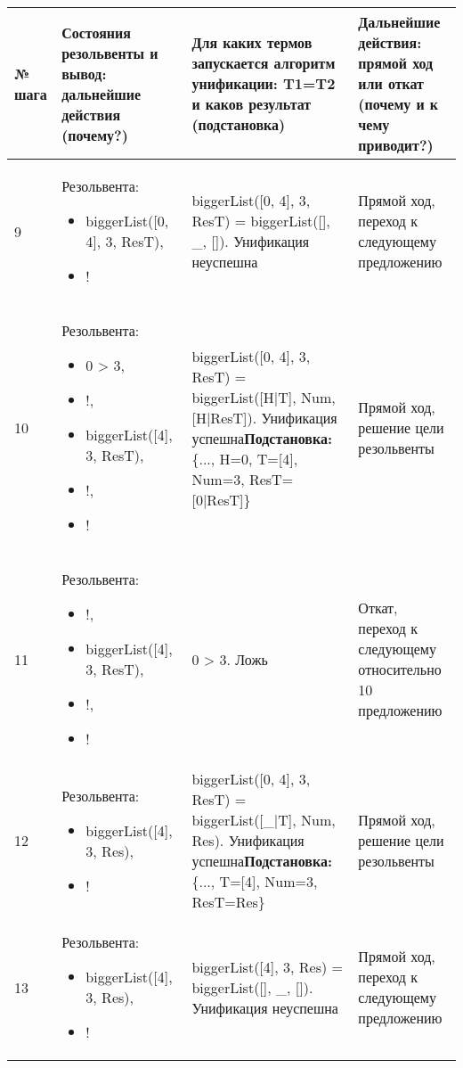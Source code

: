 \documentclass[14pt,a4paper]{scrreprt}
\begin{document}
\begin{table}[H]
	\begin{tabular}{|p{0.8cm\small}|p{4.7cm\small}|p{5.7cm\small}|p{4cm\small}|}	
		\hline
		№ шага & Состояния резольвенты и вывод: дальнейшие действия (почему?) & Для каких термов запускается алгоритм унификации: T1=T2 и каков результат (подстановка) & Дальнейшие действия: прямой ход или откат (почему и к чему приводит?)\\
		\hline
		9 & Резольвента: \begin{itemize} \item biggerList([0, 4], 3, ResT), \item ! \end{itemize} & biggerList([0, 4], 3, ResT) = biggerList([], \_, []). Унификация неуспешна & Прямой ход, переход к следующему предложению\\
		\hline
		10 & Резольвента: \begin{itemize}  \item 0 > 3, \item !, \item biggerList([4], 3, ResT), \item !, \item ! \end{itemize} & biggerList([0, 4], 3, ResT) = biggerList([H|T], Num, [H|ResT]). Унификация успешна\linebreak \textbf{Подстановка:} \{..., H=0, T=[4], Num=3, ResT=[0|ResT]\} & Прямой ход, решение цели резольвенты\\
		\hline
		11 & Резольвента: \begin{itemize}\item !, \item biggerList([4], 3, ResT), \item !, \item ! \end{itemize} & 0 > 3. Ложь & Откат, переход к следующему относительно 10 предложению\\
		\hline
		12 & Резольвента: \begin{itemize} \item biggerList([4], 3, Res), \item ! \end{itemize} & biggerList([0, 4], 3, ResT) = biggerList([\_|T], Num, Res). Унификация успешна\linebreak \textbf{Подстановка:} \{..., T=[4], Num=3, ResT=Res\} & Прямой ход, решение цели резольвенты\\
		\hline
		13 & Резольвента: \begin{itemize} \item biggerList([4], 3, Res), \item ! \end{itemize} & biggerList([4], 3, Res) = biggerList([], \_, []). Унификация неуспешна & Прямой ход, переход к следующему предложению\\

\end{tabular}
\end{table}
\end{document}
